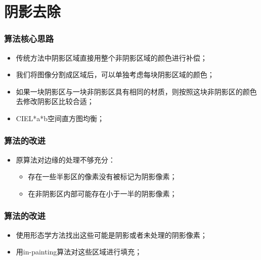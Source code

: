 \section{阴影去除}
\begin{frame}
\frametitle{算法核心思路}
\begin{itemize}
	\item 传统方法中阴影区域直接用整个非阴影区域的颜色进行补偿；
	\item 我们将图像分割成区域后，可以单独考虑每块阴影区域的颜色；
	\item 如果一块阴影区与一块非阴影区具有相同的材质，则按照这块非阴影区的颜色去修改阴影区比较合适；
	\item CIEL*a*b空间直方图均衡；
\end{itemize}
\begin{figure}
\center
\end{figure}
\end{frame}
\begin{frame}
\frametitle{算法的改进}
\begin{itemize}
	\item 原算法对边缘的处理不够充分：
	\begin{itemize}
		\item 存在一些半影区的像素没有被标记为阴影像素；
		\item 在非阴影区内部可能存在小于一半的阴影像素；
	\end{itemize}
\end{itemize}
\begin{figure}
\center
\end{figure}
\end{frame}
\begin{frame}
\frametitle{算法的改进}
\begin{itemize}
	\item 使用形态学方法找出这些可能是阴影或者未处理的阴影像素；
	\item 用in-painting算法对这些区域进行填充；
\end{itemize}
\begin{figure}
\center
\end{figure}
\end{frame}
